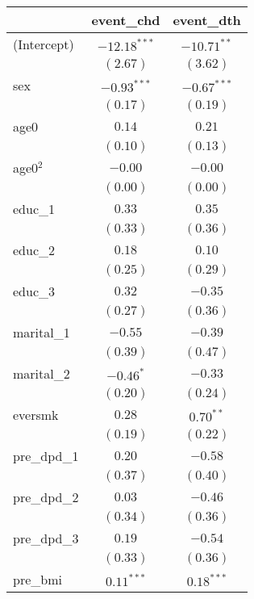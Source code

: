 
\begin{tabular}{l c c}
\toprule
 & event_chd & event_dth \\
\midrule
(Intercept)      & $-12.18^{***}$ & $-10.71^{**}$ \\
                 & $(2.67)$       & $(3.62)$      \\
sex              & $-0.93^{***}$  & $-0.67^{***}$ \\
                 & $(0.17)$       & $(0.19)$      \\
age0             & $0.14$         & $0.21$        \\
                 & $(0.10)$       & $(0.13)$      \\
age0$^2$         & $-0.00$        & $-0.00$       \\
                 & $(0.00)$       & $(0.00)$      \\
educ\_1          & $0.33$         & $0.35$        \\
                 & $(0.33)$       & $(0.36)$      \\
educ\_2          & $0.18$         & $0.10$        \\
                 & $(0.25)$       & $(0.29)$      \\
educ\_3          & $0.32$         & $-0.35$       \\
                 & $(0.27)$       & $(0.36)$      \\
marital\_1       & $-0.55$        & $-0.39$       \\
                 & $(0.39)$       & $(0.47)$      \\
marital\_2       & $-0.46^{*}$    & $-0.33$       \\
                 & $(0.20)$       & $(0.24)$      \\
eversmk          & $0.28$         & $0.70^{**}$   \\
                 & $(0.19)$       & $(0.22)$      \\
pre\_dpd\_1      & $0.20$         & $-0.58$       \\
                 & $(0.37)$       & $(0.40)$      \\
pre\_dpd\_2      & $0.03$         & $-0.46$       \\
                 & $(0.34)$       & $(0.36)$      \\
pre\_dpd\_3      & $0.19$         & $-0.54$       \\
                 & $(0.33)$       & $(0.36)$      \\
pre\_bmi         & $0.11^{***}$   & $0.18^{***}$  \\

\end{tabular}
